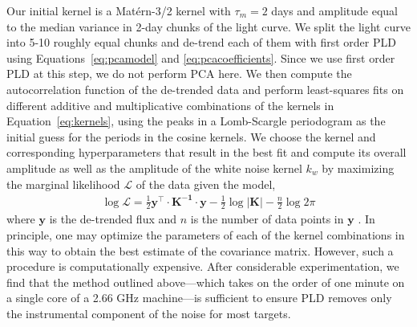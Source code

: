 \documentclass[]{emulateapj}
\begin{document}
Our initial kernel is a Mat\'ern-3/2 kernel with $\tau_m = 2$ days and amplitude
equal to the median variance in 2-day chunks of the light curve. We split the light curve
into 5-10 roughly equal chunks and de-trend each of them with first order PLD
using Equations~\ref{eq:pcamodel} and \ref{eq:pcacoefficients}. Since we use first order
PLD at this step, we do not perform PCA here. We then compute the 
autocorrelation function of the de-trended data and perform least-squares fits
on different additive and multiplicative combinations of the kernels in Equation~\ref{eq:kernels}, using
the peaks in a Lomb-Scargle periodogram as the initial
guess for the periods in the cosine kernels. We choose the kernel and corresponding
hyperparameters that result in the best fit and compute its overall amplitude
as well as the amplitude of the white noise kernel $k_w$
by maximizing the marginal likelihood $\mathcal{L}$ of the data given the model,
\begin{align}
\label{eq:like}
\log\mathcal{L} = \frac{1}{2}\mathbf{y}^\top\cdot\mathbf{K^{-1}}\cdot\mathbf{y} - \frac{1}{2}\log\left|\mathbf{K}\right| - \frac{n}{2}\log 2\pi
\end{align}
where $\mathbf{y}$ is the de-trended flux and $n$ is the number of data points 
in $\mathbf{y}$ \citep{RW06}. In principle, one may optimize the parameters of each
of the kernel combinations in this way to obtain the best estimate of the covariance
matrix. However, such a procedure is computationally expensive. After considerable
experimentation, we find that the method outlined above---which takes on the order of one
minute on a single core of a 2.66 GHz machine---is sufficient to ensure PLD removes
only the instrumental component of the noise for most targets.
\end{document}
